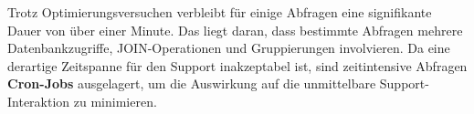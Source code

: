 Trotz Optimierungsversuchen verbleibt für einige Abfragen eine signifikante Dauer von über einer Minute. Das liegt daran, dass bestimmte Abfragen mehrere Datenbankzugriffe, JOIN-Operationen und Gruppierungen involvieren. Da eine derartige Zeitspanne für den Support inakzeptabel ist, sind zeitintensive Abfragen \textbf{Cron-Jobs} ausgelagert, um die Auswirkung auf die unmittelbare Support-Interaktion zu minimieren.
